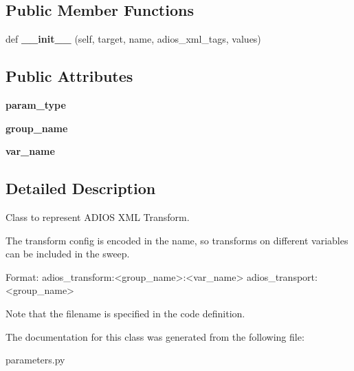 \subsection*{Public Member Functions}
\begin{DoxyCompactItemize}
\item 
\mbox{\label{classcodar_1_1cheetah_1_1parameters_1_1_param_adios_x_m_l_adf9f325576073f42a6e6258403d2632a}} 
def {\bfseries \+\_\+\+\_\+init\+\_\+\+\_\+} (self, target, name, adios\+\_\+xml\+\_\+tags, values)
\end{DoxyCompactItemize}
\subsection*{Public Attributes}
\begin{DoxyCompactItemize}
\item 
\mbox{\label{classcodar_1_1cheetah_1_1parameters_1_1_param_adios_x_m_l_afde8e863f3fb2178723d8f66d6517da2}} 
{\bfseries param\+\_\+type}
\item 
\mbox{\label{classcodar_1_1cheetah_1_1parameters_1_1_param_adios_x_m_l_a248f6d5289be4cad0d6874ece711189b}} 
{\bfseries group\+\_\+name}
\item 
\mbox{\label{classcodar_1_1cheetah_1_1parameters_1_1_param_adios_x_m_l_a8b796c2d1149b202122fcf13a8d31660}} 
{\bfseries var\+\_\+name}
\end{DoxyCompactItemize}


\subsection{Detailed Description}
\begin{DoxyVerb}Class to represent ADIOS XML Transform.

The transform config is encoded in the name, so transforms on different
variables can be included in the sweep.

Format:
    adios_transform:<group_name>:<var_name>
    adios_transport:<group_name>

Note that the filename is specified in the code definition.
\end{DoxyVerb}
 

The documentation for this class was generated from the following file\+:\begin{DoxyCompactItemize}
\item 
parameters.\+py\end{DoxyCompactItemize}
